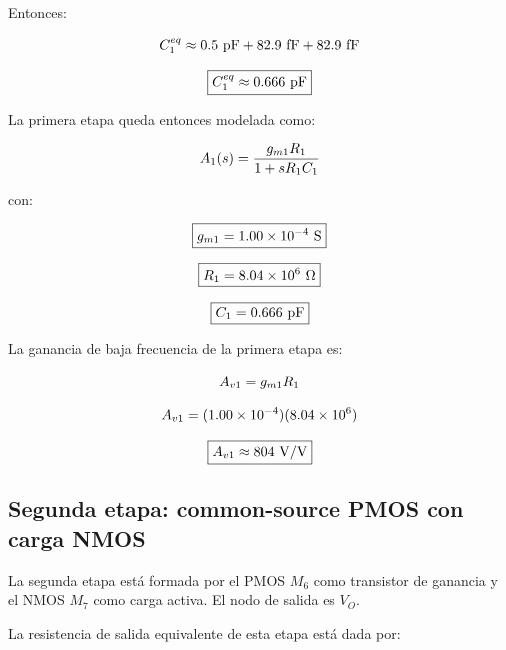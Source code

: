 Entonces:

\begin{equation}\notag
C_1^{eq}
\approx
0.5\ \mathrm{pF}
+
82.9\ \mathrm{fF}
+
82.9\ \mathrm{fF}
\end{equation}

\begin{equation}\notag
\boxed{
C_1^{eq}\approx 0.666\ \mathrm{pF}
}
\end{equation}

La primera etapa queda entonces modelada como:

\begin{equation}\notag
A_1(s)=
\frac{g_{m1}R_1}{1+sR_1C_1}
\end{equation}

con:

\begin{equation}\notag
\boxed{
g_{m1}=1.00\times 10^{-4}\ \mathrm{S}
}
\end{equation}

\begin{equation}\notag
\boxed{
R_1=8.04\times 10^{6}\ \Omega
}
\end{equation}

\begin{equation}\notag
\boxed{
C_1=0.666\ \mathrm{pF}
}
\end{equation}

La ganancia de baja frecuencia de la primera etapa es:

\begin{equation}\notag
A_{v1}=g_{m1}R_1
\end{equation}

\begin{equation}\notag
A_{v1}
=
(1.00\times 10^{-4})
(8.04\times 10^{6})
\end{equation}

\begin{equation}\notag
\boxed{
A_{v1}\approx 804\ \mathrm{V/V}
}
\end{equation}

\subsection*{Segunda etapa: common-source PMOS con carga NMOS}

La segunda etapa está formada por el PMOS \(M_6\) como transistor de ganancia y el NMOS \(M_7\) como carga activa. El nodo de salida es \(V_O\).

La resistencia de salida equivalente de esta etapa está dada por:

